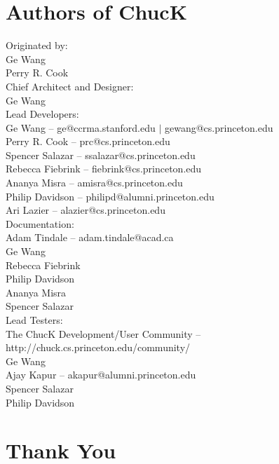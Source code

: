 \newpage
\section{Authors of ChucK}

Originated by:\\
\authtab Ge Wang\\
\authtab Perry R. Cook\\

Chief Architect and Designer:\\
\authtab Ge Wang\\

Lead Developers:\\
\authtab Ge Wang -- ge@ccrma.stanford.edu $|$ gewang@cs.princeton.edu\\
\authtab Perry R. Cook -- prc@cs.princeton.edu\\
\authtab Spencer Salazar -- ssalazar@cs.princeton.edu\\
\authtab Rebecca Fiebrink -- fiebrink@cs.princeton.edu\\
\authtab Ananya Misra -- amisra@cs.princeton.edu\\
\authtab Philip Davidson -- philipd@alumni.princeton.edu\\
\authtab Ari Lazier -- alazier@cs.princeton.edu\\

Documentation:\\
\authtab Adam Tindale -- adam.tindale@acad.ca\\
\authtab Ge Wang\\
\authtab Rebecca Fiebrink\\
\authtab Philip Davidson\\
\authtab Ananya Misra\\
\authtab Spencer Salazar\\

Lead Testers:\\
\authtab The ChucK Development/User Community -- http://chuck.cs.princeton.edu/community/\\
\authtab Ge Wang\\
\authtab Ajay Kapur -- akapur@alumni.princeton.edu\\
\authtab Spencer Salazar\\
\authtab Philip Davidson\\

\newpage
\section{Thank You}

